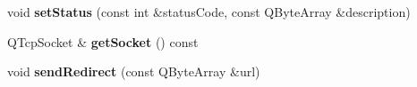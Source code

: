 \begin{DoxyCompactItemize}
\item 
\mbox{\label{class_http_servlet_response_a180f9d63cb4640fcf13f01badef9fede}} 
void {\bfseries set\+Status} (const int \&status\+Code, const Q\+Byte\+Array \&description)
\item 
\mbox{\label{class_http_servlet_response_a723210f05b22fa9cfe84e3460c6b33ff}} 
Q\+Tcp\+Socket \& {\bfseries get\+Socket} () const
\item 
\mbox{\label{class_http_servlet_response_a3f4a749e518ad2b89aaf179c5e5fe034}} 
void {\bfseries send\+Redirect} (const Q\+Byte\+Array \&url)
\end{DoxyCompactItemize}
